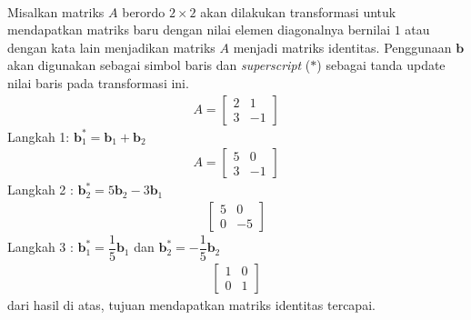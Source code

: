 \documentclass{article}   %
\begin{document}
		\paragraph*{} Misalkan matriks $A$ berordo $2\times2$ akan dilakukan transformasi untuk mendapatkan matriks baru dengan nilai elemen diagonalnya bernilai $1$ atau dengan kata lain menjadikan matriks $A$ menjadi matriks identitas. Penggunaan $\textbf{b}$ akan digunakan sebagai simbol baris dan \textit{superscript} ($*$) sebagai tanda update nilai baris pada transformasi ini.
		\begin{align*}
		A = \left[
		\begin{array}{rr} 
			2 & 1 \\
			3 & -1 
		\end{array} 
		\right]
		\end{align*}
		Langkah 1: $\textbf{b}^*_1= \textbf{b}_1 + \textbf{b}_2$ \\
		\begin{align*}
			A=\left[
			\begin{array}{rr} 
				5 & 0 \\
				3 & -1 
			\end{array} 
			\right]
		\end{align*}
		Langkah 2 : $\textbf{b}^*_2= 5\textbf{b}_2 - 3\textbf{b}_1$ \\
		\begin{align*}
			\left[
			\begin{array}{rr} 
				5 & 0 \\
				0 & -5 
			\end{array} 
			\right]
		\end{align*}
		Langkah 3 : $\textbf{b}^*_1= \dfrac{1}{5}\textbf{b}_1 $ dan $\textbf{b}^*_2= -\dfrac{1}{5}\textbf{b}_2$ \\
		\begin{align*}
			\left[
			\begin{array}{rr} 
				1 & 0 \\
				0 & 1
			\end{array} 
			\right]
		\end{align*}
		dari hasil di atas, tujuan mendapatkan matriks identitas tercapai. 
		
\end{document}
